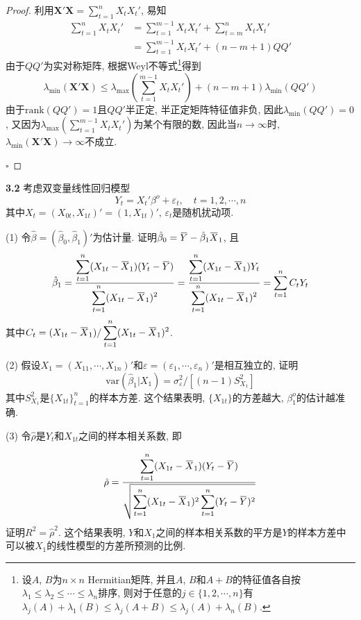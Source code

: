 \documentclass[cn,12pt,math=mtpro2,citestyle=gb7714-2015,bibstyle=gb7714-2015,twocol,mode=simple]{elegantbook}
\newcommand{\overbar}[1]{\mkern 1.5mu\overline{\mkern-1.5mu#1\mkern-1.5mu}\mkern 1.5mu}
\newcommand{\var}{\text{var}}
\newcommand{\hbeta}{\hat{\beta}}
\begin{document}
\begin{proof}
  利用$\displaystyle \mathbf{X}'\mathbf{X}=\sum_{t=1}^{n}X_tX_t'$, 易知
  \begin{align}
  \sum_{t=1}^{n}X_tX_t'&=\sum_{t=1}^{m-1}X_tX_t'+\sum_{t=m}^{n}X_tX_t' \nonumber \\
  &=\sum_{t=1}^{m-1}X_tX_t'+(n-m+1)QQ' \nonumber
  \end{align}
  由于$QQ'$为实对称矩阵, 根据Weyl不等式\footnote{设$A$, $B$为$n \times n$ Hermitian矩阵, 并且$A$, $B$和$A+B$的特征值各自按$\lambda_1\leq\lambda_2\leq\cdots\leq\lambda_n$排序, 则对于任意的$ j \in \{1,2,\cdots,n\}$有$\lambda_j(A)+\lambda_1(B)\leq\lambda_{j}(A+B)\leq\lambda_j(A)+\lambda_n(B)$.}得到
  $$\lambda_{\min}(\mathbf{X}'\mathbf{X})\leq \lambda_{\max}\left(\sum_{t=1}^{m-1}X_tX_t'\right)+(n-m+1)\lambda_{\min}(QQ')$$
  由于$\text{rank}(QQ')=1$且$QQ'$半正定, 半正定矩阵特征值非负, 因此$\lambda_{\min}(QQ')=0$, 又因为$\displaystyle \lambda_{\max}\left(\sum_{t=1}^{m-1}X_tX_t'\right)$为某个有限的数, 因此当$n\rightarrow\infty$时, $\lambda_{\min}(\mathbf{X}'\mathbf{X})\rightarrow\infty$不成立.

  $\square$
\end{proof}

\textbf{3.2} 考虑双变量线性回归模型
$$Y_t=X_t'\beta^o+\varepsilon_t,\quad t=1,2,\cdots,n$$
其中$X_t=(X_{0t},X_{1t})'=(1,X_{1t})'$, $\varepsilon_t$是随机扰动项.

(1) 令$\hbeta=(\hbeta_0,\hbeta_1)'$为估计量. 证明$\hbeta_0=\overbar{Y}-\hbeta_1\overbar{X}_1$, 且
$$\hbeta_1=\frac{\displaystyle \sum_{t=1}^{n}(X_{1t}-\overbar{X}_1)(Y_t-\overbar{Y})}{\displaystyle \sum_{t=1}^{n}(X_{1t}-\overbar{X}_1)^2}=\frac{\displaystyle \sum_{t=1}^{n}(X_{1t}-\overbar{X}_1)Y_t}{\displaystyle \sum_{t=1}^{n}(X_{1t}-\overbar{X}_1)^2}=\sum_{t=1}^{n}C_tY_t$$
其中$\displaystyle C_t=(X_{1t}-\overbar{X}_1)/\sum_{t=1}^{n}(X_{1t}-\overbar{X}_1)^2$.

(2) 假设$X_1=(X_{11},\cdots,X_{1n})'$和$\varepsilon=(\varepsilon_1,\cdots,\varepsilon_n)'$是相互独立的, 证明
$$\var(\hbeta_1|X_1)=\sigma^2_{\varepsilon}/[(n-1)S^2_{X_1}]$$
其中$S^2_{X_1}$是$\{X_{1t}\}_{t=1}^n$的样本方差. 这个结果表明, $\{X_{1t}\}$的方差越大, $\beta_1^o$的估计越准确.

(3) 令$\hat{\rho}$是$Y_t$和$X_{1t}$之间的样本相关系数, 即

$$\hat{\rho}=\frac{\displaystyle \sum_{t=1}^{n}(X_{1t}-\overbar{X}_1)(Y_t-\overbar{Y})}{\displaystyle\sqrt{\sum_{t=1}^{n}(X_{1t}-\overbar{X}_1)^2\sum_{t=1}^{n}(Y_{t}-\overbar{Y})^2}}$$
证明$R^2=\hat{\rho}^2$. 这个结果表明, $Y$和$X_1$之间的样本相关系数的平方是$Y$的样本方差中可以被$X_1$的线性模型的方差所预测的比例.
\end{document}
